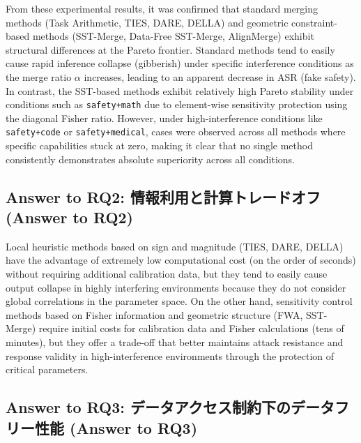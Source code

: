 \documentclass{article}
\begin{document}
From these experimental results, it was confirmed that standard merging methods (Task Arithmetic, TIES, DARE, DELLA) and geometric constraint-based methods (SST-Merge, Data-Free SST-Merge, AlignMerge) exhibit structural differences at the Pareto frontier. Standard methods tend to easily cause rapid inference collapse (gibberish) under specific interference conditions as the merge ratio $\alpha$ increases, leading to an apparent decrease in ASR (fake safety). In contrast, the SST-based methods exhibit relatively high Pareto stability under conditions such as \texttt{safety+math} due to element-wise sensitivity protection using the diagonal Fisher ratio. However, under high-interference conditions like \texttt{safety+code} or \texttt{safety+medical}, cases were observed across all methods where specific capabilities stuck at zero, making it clear that no single method consistently demonstrates absolute superiority across all conditions.

\subsection{Answer to RQ2: 情報利用と計算トレードオフ (Answer to RQ2)}

Local heuristic methods based on sign and magnitude (TIES, DARE, DELLA) have the advantage of extremely low computational cost (on the order of seconds) without requiring additional calibration data, but they tend to easily cause output collapse in highly interfering environments because they do not consider global correlations in the parameter space. On the other hand, sensitivity control methods based on Fisher information and geometric structure (FWA, SST-Merge) require initial costs for calibration data and Fisher calculations (tens of minutes), but they offer a trade-off that better maintains attack resistance and response validity in high-interference environments through the protection of critical parameters.

\subsection{Answer to RQ3: データアクセス制約下のデータフリー性能 (Answer to RQ3)}
\end{document}
